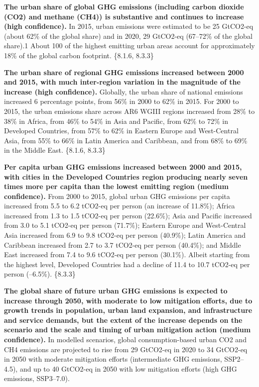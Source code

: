 \documentclass[
  letterpaper,
  DIV=11,
  numbers=noendperiod]{scrreprt}
\begin{document}
\textbf{The urban share of global GHG emissions (including carbon
dioxide (CO2) and methane (CH4)) is substantive and continues to
increase (high confidence).} In 2015, urban emissions were estimated to
be 25 GtCO2-eq (about 62\% of the global share) and in 2020, 29 GtCO2-eq
(67--72\% of the global share).1 About 100 of the highest emitting urban
areas account for approximately 18\% of the global carbon footprint.
\{8.1.6, 8.3.3\}

\textbf{The urban share of regional GHG emissions increased between 2000
and 2015, with much inter-region variation in the magnitude of the
increase (high confidence).} Globally, the urban share of national
emissions increased 6 percentage points, from 56\% in 2000 to 62\% in
2015. For 2000 to 2015, the urban emissions share across AR6 WGIII
regions increased from 28\% to 38\% in Africa, from 46\% to 54\% in Asia
and Pacific, from 62\% to 72\% in Developed Countries, from 57\% to 62\%
in Eastern Europe and West-Central Asia, from 55\% to 66\% in Latin
America and Caribbean, and from 68\% to 69\% in the Middle East.
\{8.1.6, 8.3.3\}

\textbf{Per capita urban GHG emissions increased between 2000 and 2015,
with cities in the Developed Countries region producing nearly seven
times more per capita than the lowest emitting region (medium
confidence).} From 2000 to 2015, global urban GHG emissions per capita
increased from 5.5 to 6.2 tCO2-eq per person (an increase of 11.8\%);
Africa increased from 1.3 to 1.5 tCO2-eq per person (22.6\%); Asia and
Pacific increased from 3.0 to 5.1 tCO2-eq per person (71.7\%); Eastern
Europe and West-Central Asia increased from 6.9 to 9.8 tCO2-eq per
person (40.9\%); Latin America and Caribbean increased from 2.7 to 3.7
tCO2-eq per person (40.4\%); and Middle East increased from 7.4 to 9.6
tCO2-eq per person (30.1\%). Albeit starting from the highest level,
Developed Countries had a decline of 11.4 to 10.7 tCO2-eq per person
(--6.5\%). \{8.3.3\}

\textbf{The global share of future urban GHG emissions is expected to
increase through 2050, with moderate to low mitigation efforts, due to
growth trends in population, urban land expansion, and infrastructure
and service demands, but the extent of the increase depends on the
scenario and the scale and timing of urban mitigation action (medium
confidence).} In modelled scenarios, global consumption-based urban CO2
and CH4 emissions are projected to rise from 29 GtCO2-eq in 2020 to 34
GtCO2-eq in 2050 with moderate mitigation efforts (intermediate GHG
emissions, SSP2--4.5), and up to 40 GtCO2-eq in 2050 with low mitigation
efforts (high GHG emissions, SSP3--7.0).
\end{document}
